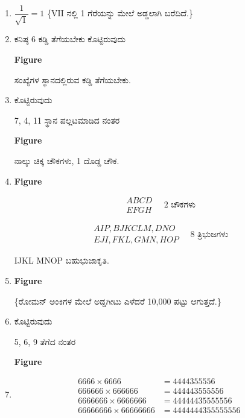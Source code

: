 \begin{enumerate}
\item $\dfrac{1}{\sqrt{1}} = 1$ \{VII ನಲ್ಲಿ 1 ಗೆರೆಯನ್ನು ಮೇಲೆ ಅಡ್ಡಲಾಗಿ ಬರೆದಿದೆ.\}

\item ಕನಿಷ್ಠ 6 ಕಡ್ಡಿ ತೆಗೆಯಬೇಕು ಕೊಟ್ಟಿರುವುದು

\begin{center}
{\bf Figure}

ಸಂಖ್ಯೆಗಳ ಸ್ಥಾನದಲ್ಲಿರುವ ಕಡ್ಡಿ ತೆಗೆಯಬೇಕು.
\end{center}

\item ಕೊಟ್ಟಿರುವುದು 

7, 4, 11 ಸ್ಥಾನ ಪಲ್ಲಟಮಾಡಿದ ನಂತರ 
\begin{center}
{\bf Figure}

ನಾಲ್ಕು ಚಿಕ್ಕ ಚೌಕಗಳು, 1 ದೊಡ್ಡ ಚೌಕ.
\end{center}

\item 
\begin{center}
{\bf Figure}
\end{center}
\begin{equation*}
\begin{aligned}
ABCD\\
EFGH 
\end{aligned}
\quad 2\text{ ಚೌಕಗಳು}
\end{equation*}

\begin{equation*}
\begin{aligned}
AIP, BJK CLM, DNO\\
EJI, FKL, GMN, HOP
\end{aligned}
\quad 8\text{  ತ್ರಿಭುಜಗಳು}
\end{equation*}

IJKL MNOP ಬಹುಭುಜಾಕೃತಿ.

\item 
\begin{center}
{\bf Figure}
\end{center}

\{ರೋಮನ್ ಅಂಕಿಗಳ ಮೇಲೆ ಅಡ್ಡಗೀಟು ಎಳೆದರೆ 10,000 ಪಟ್ಟು ಆಗುತ್ತದೆ.\}

\item ಕೊಟ್ಟಿರುವುದು 

5, 6, 9 ತೆಗೆದ ನಂತರ 

\begin{center}
{\bf Figure}
\end{center}

\item 
\begin{align*}
6666 \times 6666 & = 4444 355556\\
666666 \times 666666 & = 44444 3555556\\
6666666 \times 6666666 & = 444444 35555556\\
66666666 \times 66666666 & = 4444444 355555556
\end{align*}


\end{enumerate}
